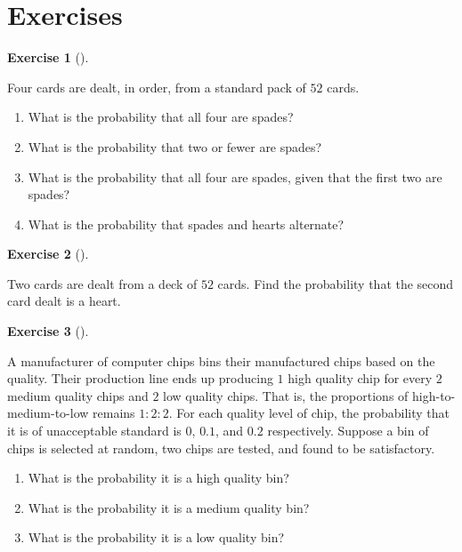 \documentclass[
  letterpaper,
  DIV=11,
  numbers=noendperiod]{scrreprt}
\providecommand{\tightlist}{%
  \setlength{\itemsep}{0pt}\setlength{\parskip}{0pt}}\usepackage{longtable,booktabs,array}
\theoremstyle{definition}
\newtheorem{exercise}{Exercise}[chapter]
\theoremstyle{definition}
\theoremstyle{definition}
\theoremstyle{remark}
\begin{document}
\section*{Exercises}\label{exercises-2}


\begin{exercise}[]\protect\hypertarget{exr-4.1}{}\label{exr-4.1}

Four cards are dealt, in order, from a standard pack of \(52\) cards.

\begin{enumerate}
\def\labelenumi{\alph{enumi}.}
\tightlist
\item
  What is the probability that all four are spades?
\item
  What is the probability that two or fewer are spades?
\item
  What is the probability that all four are spades, given that the first
  two are spades?
\item
  What is the probability that spades and hearts alternate?
\end{enumerate}

\end{exercise}

\begin{exercise}[]\protect\hypertarget{exr-4.2}{}\label{exr-4.2}

Two cards are dealt from a deck of \(52\) cards. Find the probability
that the second card dealt is a heart.

\end{exercise}

\begin{exercise}[]\protect\hypertarget{exr-4.3}{}\label{exr-4.3}

A manufacturer of computer chips bins their manufactured chips based on
the quality. Their production line ends up producing \(1\) high quality
chip for every \(2\) medium quality chips and \(2\) low quality chips.
That is, the proportions of high-to-medium-to-low remains \(1:2:2\). For
each quality level of chip, the probability that it is of unacceptable
standard is \(0\), \(0.1\), and \(0.2\) respectively. Suppose a bin of
chips is selected at random, two chips are tested, and found to be
satisfactory.

\begin{enumerate}
\def\labelenumi{\alph{enumi}.}
\tightlist
\item
  What is the probability it is a high quality bin?
\item
  What is the probability it is a medium quality bin?
\item
  What is the probability it is a low quality bin?
\end{enumerate}

\end{exercise}
\end{document}
